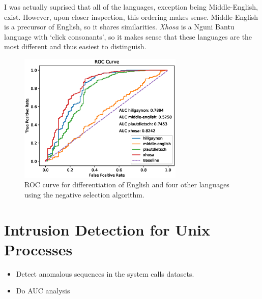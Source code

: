 \documentclass[11pt]{article}
\begin{document}
\begin{enumerate}[1.]
I was actually suprised that all of the languages, exception being Middle-English, exist. However, upon closer inspection, this ordering makes sense. Middle-English is a precursor of English, so it shares similarities. \textit{Xhosa} is a Nguni Bantu language with `click consonants', so it makes sense that these languages are the most different and thus easiest to distinguish.

\begin{figure}[H]
\centering
\includegraphics[width=0.7\textwidth]{images/roc_ex1_3.eps}
\caption{ROC curve for differentiation of English and four other languages using the negative selection algorithm.}
\label{fig:ROC_ex1_3}
\end{figure}

\end{enumerate}


\section{Intrusion Detection for Unix Processes}
\begin{itemize}
\item Detect anomalous sequences in the system calls datasets.
\item Do AUC analysis
\end{itemize}
\end{document}
